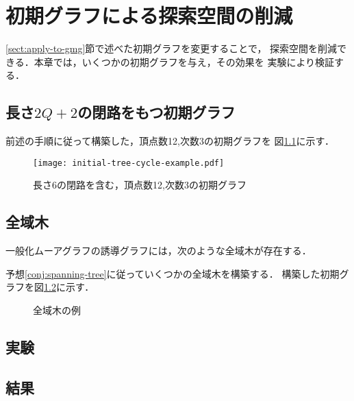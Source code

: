 
\chapter{初期グラフによる探索空間の削減}
\label{chap:reduce-by-initial-graph}
\ref{sect:apply-to-gmg}節で述べた初期グラフを変更することで，
探索空間を削減できる．本章では，いくつかの初期グラフを与え，その効果を
実験により検証する．

\section{長さ$2Q+2$の閉路をもつ初期グラフ}
\label{sect:initial-graph-cycle}
\begin{example}
  前述の手順に従って構築した，頂点数12,次数3の初期グラフを
  図\ref{fig:initial-graph-cycle-example}に示す．
  \begin{figure}
    \centering
    \texttt{[image: initial-tree-cycle-example.pdf]}
    \caption{長さ6の閉路を含む，頂点数12,次数3の初期グラフ}
    \label{fig:initial-graph-cycle-example}
  \end{figure}
\end{example}

\section{全域木}
\label{sect:initial-spanning-tree}
\begin{conjecture}[全域木予想]
  \label{conj:spanning-tree}
  一般化ムーアグラフの誘導グラフには，次のような全域木が存在する．
\end{conjecture}
\begin{example}
  予想\ref{conj:spanning-tree}に従っていくつかの全域木を構築する．
  構築した初期グラフを図\ref{fig:initial-spanning-tree-example}に示す．
\end{example}
\begin{figure}
  \centering
  \hfill
  \caption{全域木の例}
  \label{fig:initial-spanning-tree-example}
\end{figure}

\section{実験}
\label{sect:exp-reduce-by-initial}

\section{結果}
\label{sect:result-reduce-by-initial}
